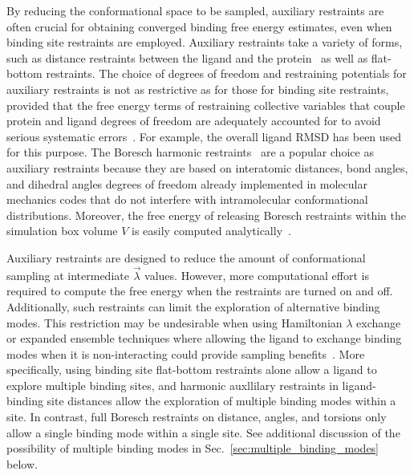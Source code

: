 \documentclass[9pt,bestpractices]{livecoms}
\begin{document}
By reducing the conformational space to be sampled, auxiliary restraints are often crucial for obtaining converged binding free energy estimates, even when binding site restraints are employed.
Auxiliary restraints take a variety of forms, such as distance restraints between the ligand and the protein~\cite{mobley2006use,clark2023comparison} as well as flat-bottom restraints. The choice of degrees of freedom and restraining potentials for auxiliary restraints is not as restrictive as for those for binding site restraints, provided that the free energy terms of restraining collective variables that couple protein and ligand degrees of freedom are adequately accounted for to avoid serious systematic errors~\cite{clark2023comparison}.
For example, the overall ligand RMSD has been used~\cite{woo2005calculation} for this purpose.
The Boresch harmonic restraints~\cite{boresch2003absolute,baumann2023broadening} are a popular choice as auxiliary restraints because they are based on interatomic distances, bond angles, and dihedral angles degrees of freedom already implemented in molecular mechanics codes that do not interfere with intramolecular conformational distributions. Moreover, the free energy of releasing Boresch restraints within the simulation box volume $V$ is easily computed analytically~\cite{boresch2003absolute, boresch2024analytical}.

Auxiliary restraints are designed to reduce the amount of conformational sampling at intermediate $\vec{\lambda}$ values. However, more computational effort is required to compute the free energy when the restraints are turned on and off. Additionally, such restraints can limit the exploration of alternative binding modes. This restriction may be undesirable when using Hamiltonian $\lambda$ exchange or expanded ensemble techniques where allowing the ligand to exchange binding modes when it is non-interacting could provide sampling benefits~\cite{wang2013identifying}.
More specifically, using binding site flat-bottom restraints alone allow a ligand to explore multiple binding sites, and harmonic auxllilary restraints in ligand-binding site distances allow the exploration of multiple binding modes within a site. In contrast, full Boresch restraints on distance, angles, and torsions only allow a single binding mode within a single site.
See additional discussion of the possibility of multiple binding modes in Sec.~\ref{sec:multiple_binding_modes} below.
\end{document}

